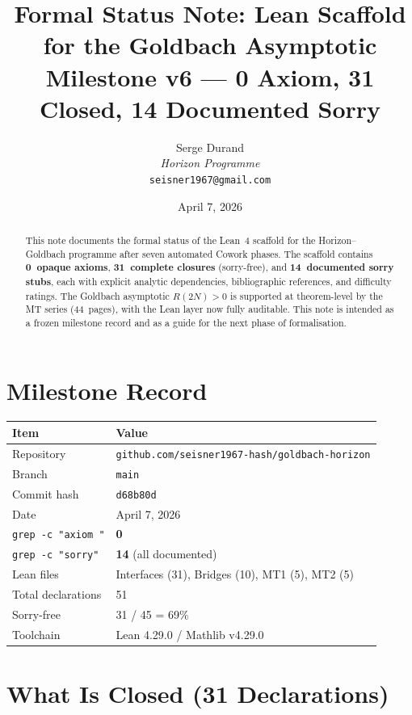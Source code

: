 \documentclass[11pt,a4paper]{article}
\title{\textbf{Formal Status Note: Lean Scaffold for the Goldbach Asymptotic}\\[6pt]
\large Milestone v6 --- 0 Axiom, 31 Closed, 14 Documented Sorry}
\author{Serge Durand\\
\textit{Horizon Programme}\\
\texttt{seisner1967@gmail.com}}
\date{April 7, 2026}
\begin{document}
\maketitle

\begin{abstract}
This note documents the formal status of the Lean~4 scaffold for the Horizon--Goldbach programme after seven automated Cowork phases.  The scaffold contains \textbf{0~opaque axioms}, \textbf{31~complete closures} (sorry-free), and \textbf{14~documented sorry stubs}, each with explicit analytic dependencies, bibliographic references, and difficulty ratings.  The Goldbach asymptotic $R(2N)>0$ is supported at theorem-level by the MT series (44~pages), with the Lean layer now fully auditable.  This note is intended as a frozen milestone record and as a guide for the next phase of formalisation.
\end{abstract}

\section{Milestone Record}

\begin{center}
\begin{tabular}{@{}ll@{}}
\toprule
\textbf{Item} & \textbf{Value} \\
\midrule
Repository & \texttt{github.com/seisner1967-hash/goldbach-horizon} \\
Branch & \texttt{main} \\
Commit hash & \texttt{d68b80d} \\
Date & April 7, 2026 \\
\texttt{grep -c "axiom "} & \textbf{0} \\
\texttt{grep -c "sorry"} & \textbf{14} (all documented) \\
Lean files & Interfaces (31), Bridges (10), MT1 (5), MT2 (5) \\
Total declarations & 51 \\
Sorry-free & 31 / 45 = 69\% \\
Toolchain & Lean 4.29.0 / Mathlib v4.29.0 \\
\bottomrule
\end{tabular}
\end{center}

\section{What Is Closed (31 Declarations)}
\end{document}
